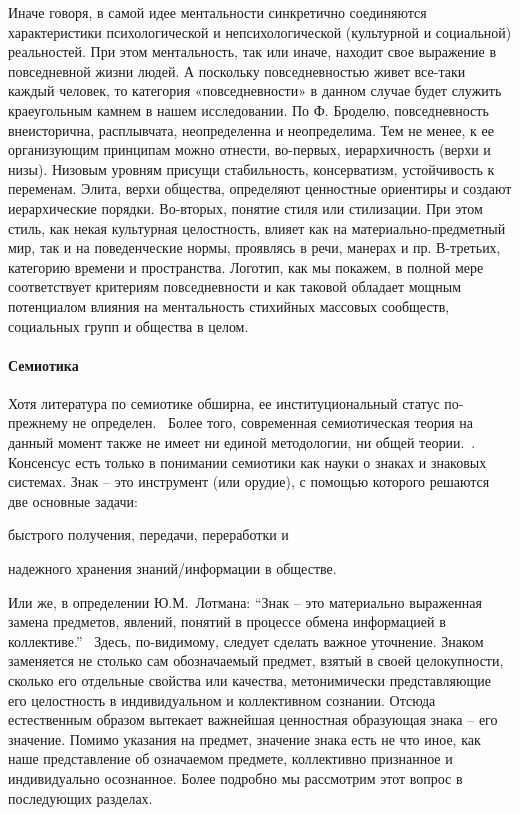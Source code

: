 Иначе говоря, в самой идее ментальности синкретично соединяются характеристики психологической и непсихологической (культурной и социальной) реальностей. При этом ментальность, так или иначе, находит свое выражение в повседневной жизни людей. А поскольку повседневностью живет все-таки каждый человек, то категория «повседневности» в данном случае будет служить краеугольным камнем в нашем исследовании. По Ф. Броделю, повседневность внеисторична, расплывчата, неопределенна и неопределима. Тем не менее, к ее организующим принципам можно отнести, во-первых, иерархичность (верхи и низы). Низовым уровням присущи стабильность, консерватизм, устойчивость к переменам. Элита, верхи общества, определяют ценностные ориентиры и создают иерархические порядки. Во-вторых, понятие стиля или стилизации. При этом стиль, как некая культурная целостность, влияет как на материально-предметный мир, так и на поведенческие нормы, проявлясь в речи, манерах и пр. В-третьих, категорию времени и пространства. Логотип, как мы покажем, в полной мере соответствует критериям повседневности и как таковой обладает мощным потенциалом влияния на ментальность стихийных массовых сообществ, социальных групп и общества в целом. 

\paragraph{Семиотика}\label{1.1.3}

Хотя литература по семиотике обширна, ее институциональный статус по-прежнему не определен.~\autocite{sirotkin}
Более того, современная семиотическая теория на данный момент также не имеет ни
единой методологии, ни общей теории.~\autocite{gorny}\autocite{gasparov}. Консенсус есть только в понимании семиотики как науки о знаках и знаковых системах. Знак -- это инструмент (или орудие),
с помощью которого решаются две основные задачи:
\begin{inparaenum}[\itshape 1\upshape)]
    \item быстрого получения, передачи, переработки и
    \item надежного хранения знаний/информации в обществе.
\end{inparaenum} Или же, в определении Ю.М.~Лотмана: ``Знак -- это материально выраженная замена предметов, явлений, понятий в процессе обмена информацией в коллективе.''~\autocite{wiki:symbol}
Здесь, по-видимому, следует сделать важное уточнение. Знаком заменяется не столько сам
обозначаемый предмет, взятый в своей целокупности, сколько его отдельные свойства или
качества, метонимически представляющие его целостность в индивидуальном и коллективном сознании. Отсюда естественным образом вытекает важнейшая ценностная образующая знака -- его значение. Помимо указания на предмет, значение знака есть не что иное, как наше представление об означаемом предмете, коллективно признанное и индивидуально осознанное. Более подробно мы рассмотрим этот вопрос в последующих разделах. 

